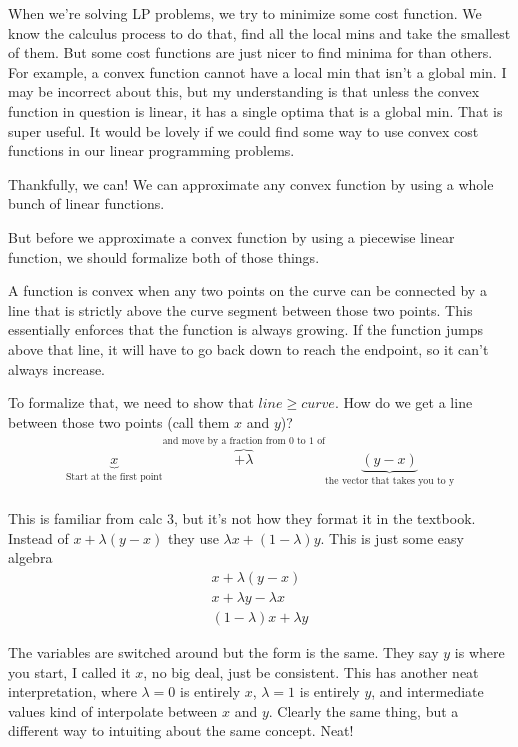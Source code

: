 \documentclass[12pt, letterpaper]{article}
\begin{document}
When we're solving LP problems, we try to minimize some cost function.
We know the calculus process to do that, find all the local mins and take the smallest of them.
But some cost functions are just nicer to find minima for than others.
For example, a convex function cannot have a local min that isn't a global min.
I may be incorrect about this, but my understanding is that unless the convex function
in question is linear, it has a single optima that is a global min.
That is super useful. It would be lovely if we could find some way to
use convex cost functions in our linear programming problems.

Thankfully, we can! We can approximate any convex function by using a whole bunch of
linear functions.

But before we approximate a convex function by using a piecewise linear function,
we should formalize both of those things.

A function is convex when any two points on the curve can be connected by a line that is strictly
above the curve segment between those two points. This essentially enforces that the function is always growing.
If the function jumps above that line, it will have to go back down to reach the endpoint, so it can't always increase.

To formalize that, we need to show that $line \geq curve$.
How do we get a line between those two points (call them $x$ and $y$)?
\begin{gather*}
    \underbrace{x}_\text{Start at the first point} \overbrace{+ \lambda}^\text{and move by a fraction from 0 to 1 of} \underbrace{(y-x)}_\text{the vector that takes you to y} \\
\end{gather*}

This is familiar from calc 3, but it's not how they format it in the textbook.
Instead of $x + \lambda(y-x)$ they use $\lambda x + (1 - \lambda)y$.
This is just some easy algebra
\begin{gather*}
    x + \lambda(y-x) \\
    x + \lambda y - \lambda x \\
    (1-\lambda) x + \lambda y
\end{gather*}

The variables are switched around but the form is the same.
They say $y$ is where you start, I called it $x$, no big deal, just be consistent.
This has another neat interpretation, where $\lambda = 0$ is entirely $x$, $\lambda = 1$ is entirely $y$,
and intermediate values kind of interpolate between $x$ and $y$. Clearly the same thing,
but a different way to intuiting about the same concept. Neat!
\end{document}
